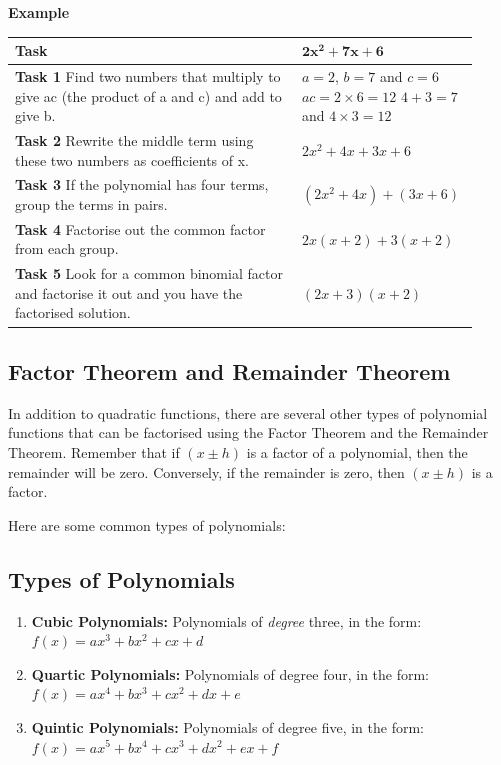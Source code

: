\medskip
\noindent\textbf{Example}
\begin{center}
\renewcommand{\arraystretch}{1.3}
\begin{tabular}{|p{0.6\linewidth}|p{0.32\linewidth}|}
\hline
\textbf{Task} & $\boldsymbol{2x^2 + 7x + 6}$ \\
\hline
\textbf{Task 1}\newline
Find two numbers that multiply to give ac (the product of a and c) and add to give b.
& $a = 2$, $b = 7$ and $c = 6$\newline
$ac = 2 \times 6 = 12$\newline
$4 + 3 = 7$ and $4 \times 3 = 12$ \\
\hline
\textbf{Task 2}\newline
Rewrite the middle term using these two numbers as coefficients of x.
& $2x^2 + 4x + 3x + 6$ \\
\hline
\textbf{Task 3}\newline
If the polynomial has four terms, group the terms in pairs.
& $(2x^2 + 4x) + (3x + 6)$ \\
\hline
\textbf{Task 4}\newline
Factorise out the common factor from each group.
& $2x(x + 2) + 3(x + 2)$ \\
\hline
\textbf{Task 5}\newline
Look for a common binomial factor and factorise it out and you have the
factorised solution.
& $(2x + 3)(x + 2)$ \\
\hline
\end{tabular}
\end{center}

\subsection{Factor Theorem and Remainder Theorem}

In addition to quadratic functions, there are several other types of polynomial
functions that can be factorised using the Factor Theorem and the Remainder
Theorem. Remember that if $(x \pm h)$ is a factor of a polynomial, then the remainder
will be zero. Conversely, if the remainder is zero, then $(x \pm h)$ is a factor.

Here are some common types of polynomials:

\subsection{Types of Polynomials}
\begin{enumerate}
  \item \textbf{Cubic Polynomials:} Polynomials of \textit{degree} three, in the form:
  $f(x) = ax^3 + bx^2 + cx + d$
  \item \textbf{Quartic Polynomials:} Polynomials of degree four, in the form:\\
  $f(x) = ax^4 + bx^3 + cx^2 + dx + e$
  \item \textbf{Quintic Polynomials:} Polynomials of degree five, in the form:\\
  $f(x) = ax^5 + bx^4 + cx^3 + dx^2 + ex + f$
\end{enumerate}

